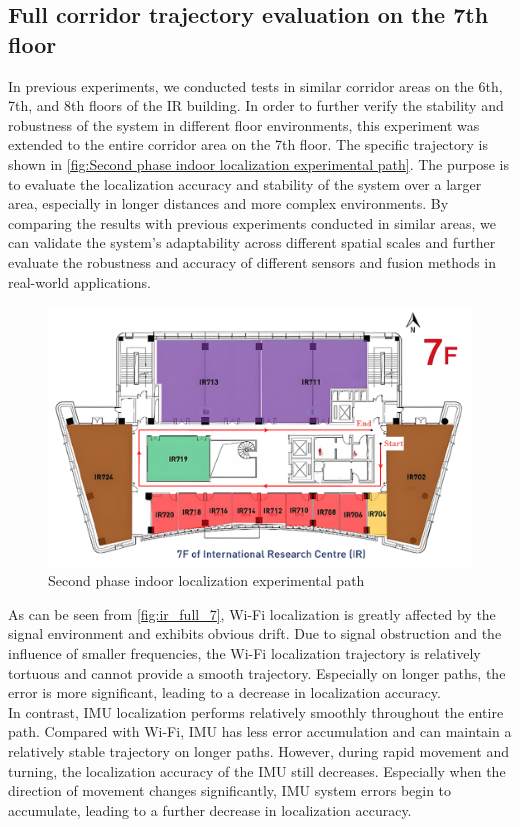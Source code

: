 \documentclass[12pt,a4paper]{article}
\numberwithin{equation}{section}
\begin{document}
\subsection{Full corridor trajectory evaluation on the 7th floor}
\noindent In previous experiments, we conducted tests in similar corridor areas on the 6th, 7th, and 8th floors of the IR building. In order to further verify the stability and robustness of the system in different floor environments, this experiment was extended to the entire corridor area on the 7th floor. The specific trajectory is shown in \autoref{fig:Second phase indoor localization experimental path}. The purpose is to evaluate the localization accuracy and stability of the system over a larger area, especially in longer distances and more complex environments. By comparing the results with previous experiments conducted in similar areas, we can validate the system's adaptability across different spatial scales and further evaluate the robustness and accuracy of different sensors and fusion methods in real-world applications.
\begin{figure}[H]
    \centering
    \includegraphics[width=0.9\linewidth]{images/ir_full_circle.png}
    \caption{Second phase indoor localization experimental path}
    \label{fig:Second phase indoor localization experimental path}
\end{figure}
\noindent As can be seen from \autoref{fig:ir_full_7}, Wi-Fi localization is greatly affected by the signal environment and exhibits obvious drift. Due to signal obstruction and the influence of smaller frequencies, the Wi-Fi localization trajectory is relatively tortuous and cannot provide a smooth trajectory. Especially on longer paths, the error is more significant, leading to a decrease in localization accuracy.\\
In contrast, IMU localization performs relatively smoothly throughout the entire path. Compared with Wi-Fi, IMU has less error accumulation and can maintain a relatively stable trajectory on longer paths. However, during rapid movement and turning, the localization accuracy of the IMU still decreases. Especially when the direction of movement changes significantly, IMU system errors begin to accumulate, leading to a further decrease in localization accuracy.\\
\end{document}
